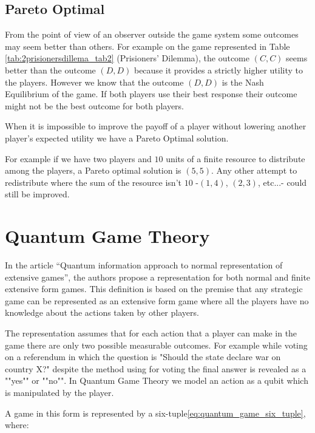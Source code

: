 \subsection{Pareto Optimal}
\label{subsec:background:game_theory_pareto_optimal}

From the point of view of an observer outside the game system some outcomes may seem better than others. For example on the game represented in Table \ref{tab:2prisionersdillema_tab2} (Prisioners' Dilemma), the outcome $(C,C)$ seems better than the outcome $(D,D)$ because it provides a strictly higher utility to the players. However we know that the outcome $(D,D)$ is the Nash Equilibrium of the game. If both players use their best response their outcome might not be the best outcome for both players.

When it is impossible to improve the payoff of a player without lowering another player's expected utility we have a Pareto Optimal solution.

For example if we have two players and $10$ units of a finite resource to distribute among the players, a Pareto optimal solution is $(5,5)$. Any other attempt to redistribute where the sum of the resource isn't $10$ -$(1,4)$, $(2,3)$, etc...- could still be improved.


\clearpage
\section{Quantum Game Theory}
\label{sec:background_quantum_game_theory}



In the article ``Quantum information approach to normal representation of extensive games''\cite{Fra2011a}, the authors propose a representation
for both normal and finite extensive form games\cite{Fra2011}. This definition is based on the premise that any strategic game can be represented as an extensive form game where all the players have no knowledge about the actions taken by other players. 

The representation assumes that for each action that a player can make in the game there are only two possible measurable outcomes. For example while voting on a referendum in which the question is "Should the state declare war on country X?" despite the method using for voting the final answer is revealed as a ""yes"" or ""no"".
In Quantum Game Theory we model an action as a qubit which is manipulated by the player. 


A game in this
form is represented by a six-tuple\eqref{eq:quantum_game_six_tuple},
where:

